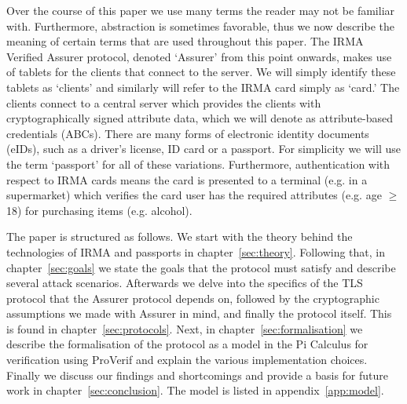 Over the course of this paper we use many terms the reader may not be familiar with. Furthermore, abstraction is sometimes favorable, thus we now describe the meaning of certain terms that are used throughout this paper. The IRMA Verified Assurer protocol, denoted `Assurer' from this point onwards, makes use of tablets for the clients that connect to the server. We will simply identify these tablets as `clients' and similarly will refer to the IRMA card simply as `card.' The clients connect to a central server which provides the clients with cryptographically signed attribute data, which we will denote as attribute-based credentials (ABCs). There are many forms of electronic identity documents (eIDs), such as a driver's license, ID card or a passport. For simplicity we will use the term `passport' for all of these variations. Furthermore, authentication with respect to IRMA cards means the card is presented to a terminal (e.g. in a supermarket) which verifies the card user has the required attributes (e.g. age $\geq$ 18) for purchasing items (e.g. alcohol).

The paper is structured as follows. We start with the theory behind the technologies of IRMA and passports in chapter~\ref{sec:theory}. Following that, in chapter~\ref{sec:goals} we state the goals that the protocol must satisfy and describe several attack scenarios. Afterwards we delve into the specifics of the TLS protocol that the Assurer protocol depends on, followed by the cryptographic assumptions we made with Assurer in mind, and finally the protocol itself. This is found in chapter~\ref{sec:protocols}. Next, in chapter~\ref{sec:formalisation} we describe the formalisation of the protocol as a model in the Pi Calculus for verification using ProVerif and explain the various implementation choices. Finally we discuss our findings and shortcomings and provide a basis for future work in chapter~\ref{sec:conclusion}. The model is listed in appendix~\ref{app:model}.


